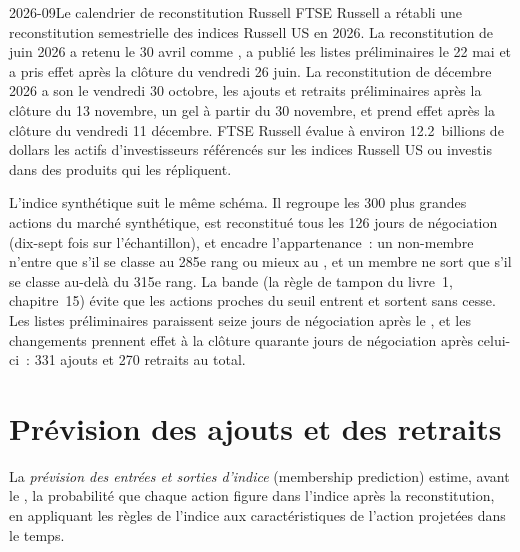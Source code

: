 \begin{dated}{2026-09}{Le calendrier de reconstitution Russell}\label{dat:s1:index-rebalancing:russell}
FTSE Russell a rétabli une reconstitution semestrielle des indices Russell US en 2026. La reconstitution de juin 2026 a retenu le 30 avril comme ,
a publié les listes préliminaires le 22 mai et a pris effet après la clôture du vendredi 26 juin. La reconstitution de décembre 2026 a son  le
vendredi 30 octobre, les ajouts et retraits préliminaires après la clôture du 13 novembre, un gel à partir du 30 novembre, et prend effet après la clôture du vendredi
11 décembre. FTSE Russell évalue à environ 12.2~billions de dollars les actifs d'investisseurs référencés sur les indices Russell US ou investis dans des produits qui les répliquent.
\end{dated}

L'indice synthétique suit le même schéma. Il regroupe les 300 plus grandes actions du marché synthétique, est reconstitué tous les 126 jours de négociation (dix-sept fois
sur l'échantillon), et encadre l'appartenance~: un non-membre n'entre que s'il se classe au 285e rang ou mieux au , et un membre ne sort que s'il se classe au-delà du 315e rang.
La bande (la règle de tampon du livre~1, chapitre~15) évite que les actions proches du seuil entrent et sortent sans cesse. Les listes préliminaires paraissent seize
jours de négociation après le , et les changements prennent effet à la clôture quarante jours de négociation après celui-ci~: 331 ajouts et 270 retraits au total.

\section{Prévision des ajouts et des retraits}

\begin{definition}\label{def:s1:index-rebalancing:prediction}
La \emph{prévision des entrées et sorties d'indice} (membership prediction) estime, avant le , la probabilité que chaque action figure dans l'indice après la
reconstitution, en appliquant les règles de l'indice aux caractéristiques de l'action projetées dans le temps.
\end{definition}

